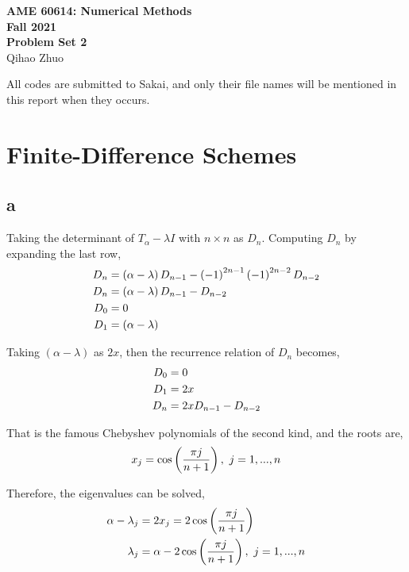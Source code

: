 \documentclass[letterpaper,10pt]{article}
\begin{document}
\fancyhf{}
\fancyfoot[C]{\thepage}

\thispagestyle{plain}
\begin{center}
  \large
  \textbf{AME 60614: Numerical Methods} \\
  \textbf{Fall 2021} \\
  \vspace{0.5em}
  \textbf{Problem Set 2} \\
  \vspace{1em}
  Qihao Zhuo
\end{center}

\vspace{1.5em}

All codes are submitted to Sakai, and only their file names will be mentioned in this report when they occurs. 
\section{Finite-Difference Schemes}
\subsection{a}
Taking the determinant of $T_{\alpha}-\lambda I$ with $n \times n$ as $D_n$. Computing $D_n$ by expanding the last row, 
\begin{align}
  D_n &= \left(\alpha-\lambda\right)D_{n-1} - \left(-1\right)^{2n-1}\left(-1\right)^{2n-2}D_{n-2}\notag\\
  D_n &= \left(\alpha-\lambda\right)D_{n-1} - D_{n-2}\notag\\
  D_0 &= 0\notag\\
  D_1 &= \left(\alpha-\lambda\right)\notag
\end{align}

Taking $\left(\alpha-\lambda\right)$ as $2x$, then the recurrence relation of $D_n$ becomes, 
\begin{align}
  D_0 &= 0\notag\\
  D_1 &= 2x\notag\\
  D_n &= 2xD_{n-1} - D_{n-2}\notag
\end{align}

That is the famous Chebyshev polynomials of the second kind, and the roots are, 
\begin{equation}
  x_j = \cos \left(\frac{\pi j}{n+1}\right),~j=1,...,n\notag
\end{equation}

Therefore, the eigenvalues can be solved, 
\begin{align}
  \alpha - \lambda_j &= 2 x_j = 2\cos \left(\frac{\pi j}{n+1}\right)\notag\\
  \lambda_j &= \alpha - 2 \cos \left(\frac{\pi j}{n+1}\right),~j=1,...,n\notag
\end{align}
\end{document}
